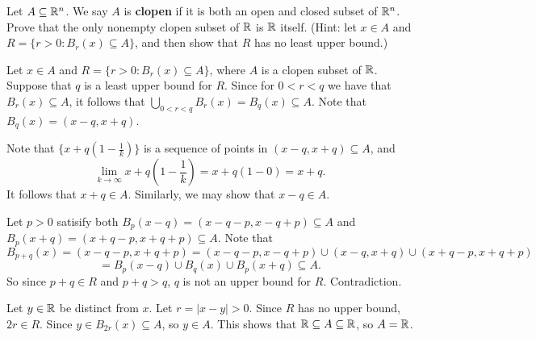 \documentclass[letterpaper, twoside, 12pt]{book}
\begin{document}
\begin{exercise}
  Let \(A\subseteq\mathbb R^n\). We say \(A\) is \textbf{clopen} if
  it is both an open and closed subset of \(\mathbb R^n\). Prove that
  the only nonempty clopen subset of \(\mathbb R\) is \(\mathbb R\) itself.
  (Hint: let \(x\in A\) and \(R=\{r>0:B_r(x)\subseteq A\}\),
  and then show that \(R\) has no least upper bound.)
\end{exercise}
\begin{solution}
  Let \(x\in A\) and \(R=\{r>0:B_r(x)\subseteq A\}\), where \(A\)
  is a clopen subset of \(\mathbb R\). Suppose that \(q\) is a least upper
  bound for \(R\). Since for \(0<r<q\) we have that \(B_r(x)\subseteq A\),
  it follows that \(\bigcup_{0<r<q}B_r(x)=B_q(x)\subseteq A\).
  Note that \(B_q(x)=(x-q,x+q)\).

  Note that \(\{x+q(1-\frac{1}{k})\}\) is a sequence of points in
  \((x-q,x+q)\subseteq A\), and
  \[\lim_{k\to\infty}x+q(1-\frac{1}{k})=x+q(1-0)=x+q.\]
  It follows that \(x+q\in A\). Similarly, we may show that \(x-q\in A\).

  Let \(p>0\) satisify both \(B_p(x-q)=(x-q-p,x-q+p)\subseteq A\) and
  \(B_p(x+q)=(x+q-p,x+q+p)\subseteq A\). Note that
  \[
    B_{p+q}(x)
      =
    (x-q-p,x+q+p)
      =
    (x-q-p,x-q+p)
      \cup
    (x-q,x+q)
      \cup
    (x+q-p,x+q+p)
  \]
  \[
      =
    B_p(x-q)
      \cup
    B_q(x)
      \cup
    B_p(x+q)
      \subseteq
    A
  .\]
  So since \(p+q\in R\) and \(p+q>q\), \(q\) is not an upper bound for
  \(R\). Contradiction.

  Let \(y\in\mathbb R\) be distinct from \(x\).
  Let \(r=|x-y|>0\). Since \(R\) has no upper bound,
  \(2r\in R\). Since \(y\in B_{2r}(x)\subseteq A\), so \(y\in A\).
  This shows that \(\mathbb R\subseteq A\subseteq \mathbb R\), so
  \(A=\mathbb R\).
\end{solution}
\end{document}
